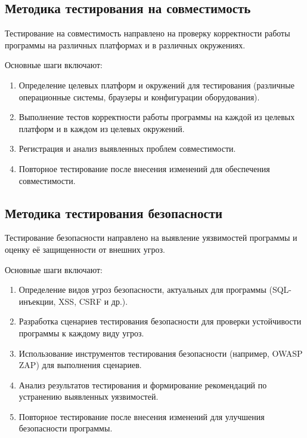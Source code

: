\documentclass{article}
\begin{document}
    \subsection{Методика тестирования на совместимость}

    Тестирование на совместимость направлено на проверку корректности работы программы на различных платформах и в различных окружениях.

    Основные шаги включают\cite{litlink9}:

    \begin{enumerate}
        \item Определение целевых платформ и окружений для тестирования (различные операционные системы, браузеры и конфигурации оборудования).
        \item Выполнение тестов корректности работы программы на каждой из целевых платформ и в каждом из целевых окружений.
        \item Регистрация и анализ выявленных проблем совместимости.
        \item Повторное тестирование после внесения изменений для обеспечения совместимости.
    \end{enumerate}

    \subsection{Методика тестирования безопасности}

    Тестирование безопасности направлено на выявление уязвимостей программы и оценку её защищенности от внешних угроз.

    Основные шаги включают\cite{litlink10}:

    \begin{enumerate}
        \item Определение видов угроз безопасности, актуальных для программы (SQL-инъекции, XSS, CSRF и др.).
        \item Разработка сценариев тестирования безопасности для проверки устойчивости программы к каждому виду угроз.
        \item Использование инструментов тестирования безопасности (например, OWASP ZAP) для выполнения сценариев.
        \item Анализ результатов тестирования и формирование рекомендаций по устранению выявленных уязвимостей.
        \item Повторное тестирование после внесения изменений для улучшения безопасности программы.
    \end{enumerate}
\end{document}

